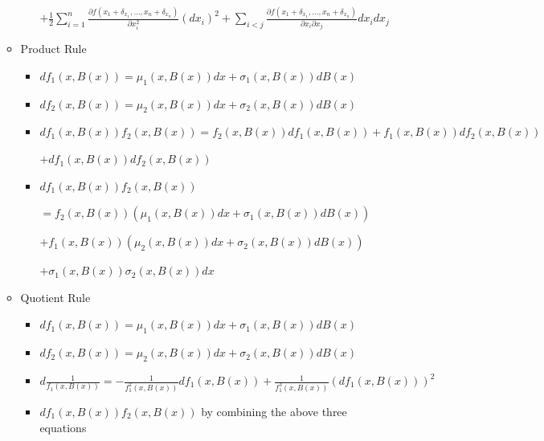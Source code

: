 \documentclass[a4paper]{article}
\begin{document}
\begin{itemize}
\begin{itemize}
\begin{itemize}
                                $+ \frac{1}{2} \sum_{i=1}^n \frac{\partial f(x_1 + \delta_{x_1}, \dots, x_n + \delta_{x_n})}{\partial x_i^2} (d x_i)^2 + \sum_{i < j} \frac{\partial f(x_1 + \delta_{x_1}, \dots, x_n + \delta_{x_n})}{\partial x_i \partial x_j} d x_i d x_j$
                \end{itemize}
            \item Product Rule
                \begin{itemize}
                    \item $d f_1(x, B(x)) = \mu_1(x, B(x)) dx + \sigma_1(x, B(x)) d B(x)$
                    \item $d f_2(x, B(x)) = \mu_2(x, B(x)) dx + \sigma_2(x, B(x)) d B(x)$
                    \item $df_1(x, B(x)) f_2(x, B(x)) = f_2(x, B(x)) df_1(x, B(x)) + f_1(x, B(x)) df_2(x, B(x))$

                        $+ d f_1(x, B(x)) df_2(x, B(x))$
                    \item $df_1(x, B(x)) f_2(x, B(x))$

                        $= f_2(x, B(x)) (\mu_1(x, B(x)) dx + \sigma_1(x, B(x)) d B(x))$

                        $+ f_1(x, B(x)) (\mu_2(x, B(x)) dx + \sigma_2(x, B(x)) d B(x))$

                        $+ \sigma_1(x, B(x))\sigma_2(x, B(x))dx$
                \end{itemize}
            \item Quotient Rule
                \begin{itemize}
                    \item $d f_1(x, B(x)) = \mu_1(x, B(x)) dx + \sigma_1(x, B(x)) d B(x)$
                    \item $d f_2(x, B(x)) = \mu_2(x, B(x)) dx + \sigma_2(x, B(x)) d B(x)$
                    \item $d\frac{1}{f_1(x, B(x))} = - \frac{1}{f_1^2(x, B(x))} df_1(x, B(x)) + \frac{1}{f_1^3(x, B(x))} (df_1(x, B(x)))^2$
                    \item $df_1(x, B(x)) f_2(x, B(x))$ by combining the above three equations
                \end{itemize}
        \end{itemize}
\end{itemize}
\end{document}
